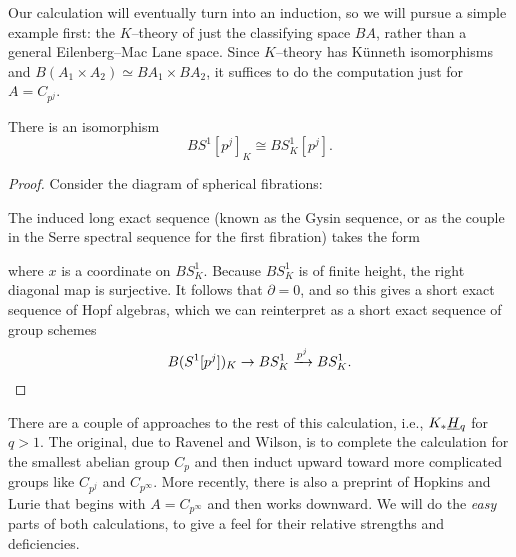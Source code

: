 Our calculation will eventually turn into an induction, so we will pursue a simple example first: the $K$--theory of just the classifying space $BA$, rather than a general Eilenberg--Mac Lane space.  Since $K$--theory has K\"unneth isomorphisms and $B(A_1 \times A_2) \simeq BA_1 \times BA_2$, it suffices to do the computation just for $A = C_{p^j}$.

\begin{theorem}
There is an isomorphism \[BS^1[p^j]_K \cong BS^1_K[p^j].\]
\end{theorem}
\begin{proof}
Consider the diagram of spherical fibrations:
\begin{center}
\end{center}
The induced long exact sequence (known as the Gysin sequence, or as the couple in the Serre spectral sequence for the first fibration) takes the form
\begin{center}
\end{center}
where $x$ is a coordinate on $BS^1_K$.  Because $BS^1_K$ is of finite height, the right diagonal map is surjective.  It follows that $\partial = 0$, and so this gives a short exact sequence of Hopf algebras, which we can reinterpret as a short exact sequence of group schemes \[B(S^1[p^j])_K \to BS^1_K \xrightarrow{p^j} BS^1_K. \qedhere\]
\end{proof}

There are a couple of approaches to the rest of this calculation, i.e., $K_* \smash{\underline{H}}_{q}$ for $q > 1$.  The original, due to Ravenel and Wilson, is to complete the calculation for the smallest abelian group $C_p$ and then induct upward toward more complicated groups like $C_{p^j}$ and $C_{p^\infty}$.  More recently, there is also a preprint of Hopkins and Lurie that begins with $A = C_{p^\infty}$ and then works downward.  We will do the \emph{easy} parts of both calculations, to give a feel for their relative strengths and deficiencies.

